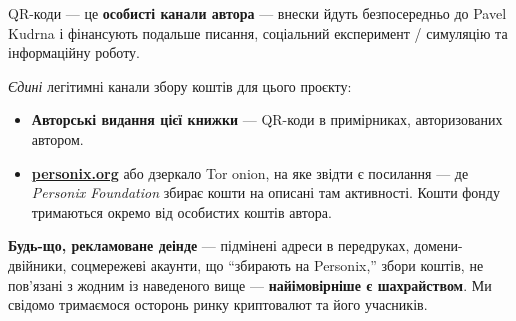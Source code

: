 \begin{minipage}[t]{0.60\textwidth}
\vspace{0pt}
\begin{mdframed}[
  linewidth=0.7pt,roundcorner=5pt,
  innerleftmargin=10pt,innerrightmargin=10pt,
  innertopmargin=8pt,innerbottommargin=8pt,
  skipabove=0pt,skipbelow=0pt,
  linecolor=cbwarning!50,backgroundcolor=cbwarning!5,
  nobreak=true,
  needspace=4\baselineskip,
]
\footnotesize
QR-коди --- це \textbf{особисті канали автора} --- внески йдуть безпосередньо до Pavel Kudrna і фінансують подальше писання, соціальний експеримент / симуляцію та інформаційну роботу.

\smallskip
\emph{Єдині} легітимні канали збору коштів для цього проєкту:

\smallskip
\begin{itemize}
\setlength{\itemsep}{0pt}
\setlength{\topsep}{0pt}
\item \textbf{Авторські видання цієї книжки} --- QR-коди в примірниках, авторизованих автором.
\item \href{https://personix.org}{\textbf{personix.org}} або дзеркало Tor onion, на яке звідти є посилання --- де \emph{Personix Foundation} збирає кошти на описані там активності. Кошти фонду тримаються окремо від особистих коштів автора.
\end{itemize}

\smallskip
\textbf{Будь-що, рекламоване деінде} --- підмінені адреси в передруках, домени-двійники, соцмережеві акаунти, що ``збирають на Personix,'' збори коштів, не пов'язані з жодним із наведеного вище --- \textbf{найімовірніше є шахрайством}. Ми свідомо тримаємося осторонь ринку криптовалют та його учасників.
\end{mdframed}
\end{minipage}

\clearpage
